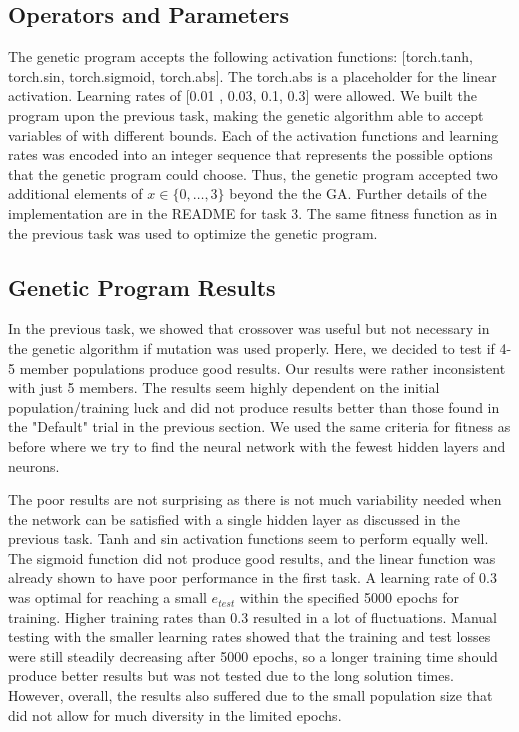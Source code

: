 \documentclass[12pt]{article}
\begin{document}
\subsection{Operators and Parameters}
The genetic program accepts the following activation functions: [torch.tanh, torch.sin, torch.sigmoid, torch.abs]. The torch.abs is a placeholder for the linear activation. Learning rates of [0.01 , 0.03, 0.1, 0.3] were allowed. We built the program upon the previous task, making the genetic algorithm able to accept variables of with different bounds. Each of the activation functions and learning rates was encoded into an integer sequence that represents the possible options that the genetic program could choose. Thus, the genetic program accepted two additional elements of $x \in \{0,\ldots,3\}$ beyond the  the GA. Further details of the implementation are in the README for task 3. The same fitness function as in the previous task was used to optimize the genetic program.
\subsection{Genetic Program Results}
In the previous task, we showed that crossover was useful but not necessary in the genetic algorithm if mutation was used properly. Here, we decided to test if 4-5 member populations produce good results. Our results were rather inconsistent with just 5 members. The results seem highly dependent on the initial population/training luck and did not produce results better than those found in the "Default" trial in the previous section. We used the same criteria for fitness as before where we try to find the neural network with the fewest hidden layers and neurons. 

The poor results are not surprising as there is not much variability needed when the network can be satisfied with a single hidden layer as discussed in the previous task. Tanh and sin activation functions seem to perform equally well. The sigmoid function did not produce good results, and the linear function was already shown to have poor performance in the first task. A learning rate of 0.3 was optimal for reaching a small $e_{test}$ within the specified 5000 epochs for training. Higher training rates than 0.3 resulted in a lot of fluctuations. Manual testing with the smaller learning rates showed that the training and test losses were still steadily decreasing after 5000 epochs, so a longer training time should produce better results but was not tested due to the long solution times. However, overall, the results also suffered due to the small population size that did not allow for much diversity in the limited epochs.
\end{document}
